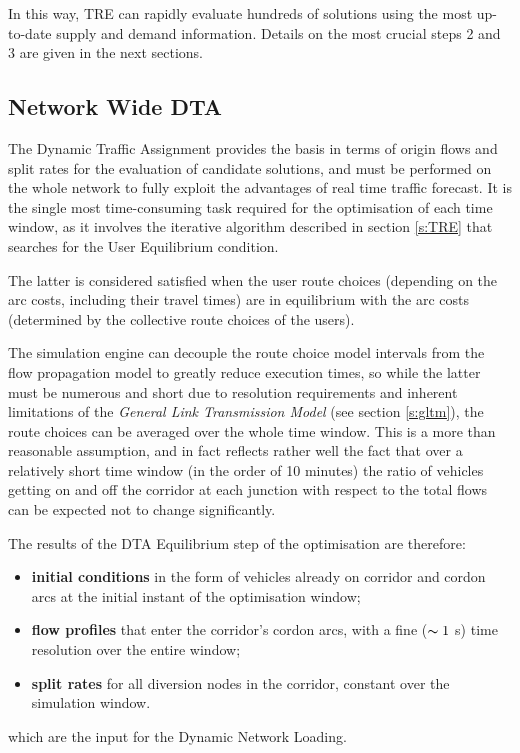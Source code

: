 In this way, TRE can rapidly evaluate hundreds of solutions using the most up-to-date supply and demand information. Details on the most crucial steps 2 and 3 are given in the next sections.

\subsection{Network Wide DTA}
The Dynamic Traffic Assignment provides the basis in terms of origin flows and split rates for the evaluation of candidate solutions, and must be performed on the whole network to fully exploit the advantages of real time traffic forecast. It is the single most time-consuming task required for the optimisation of each time window, as it involves the iterative algorithm described in section \ref{s:TRE} that searches for the User Equilibrium condition.

The latter is considered satisfied when the user route choices (depending on the arc costs, including their travel times) are in equilibrium with the arc costs (determined by the collective route choices of the users). 

The simulation engine can decouple the route choice model intervals from the flow propagation model to greatly reduce execution times, so while the latter must be numerous and short due to resolution requirements and inherent limitations of the \emph{General Link Transmission Model} (see section \ref{s:gltm}), the route choices can be averaged over the whole time window. This is a more than reasonable assumption, and in fact reflects rather well the fact that over a relatively short time window (in the order of 10 minutes) the ratio of vehicles getting on and off the corridor at each junction with respect to the total flows can be expected not to change significantly.

The results of the DTA Equilibrium step of the optimisation are therefore:
\begin{itemize}
\item \textbf{initial conditions} in the form of vehicles already on corridor and cordon arcs at the initial instant of the optimisation window;
\item \textbf{flow profiles} that enter the corridor's cordon arcs, with a fine ($\thicksim 1$ s) time resolution over the entire window;
\item \textbf{split rates} for all diversion nodes in the corridor, constant over the simulation window.
\end{itemize} 
which are the input for the Dynamic Network Loading.


